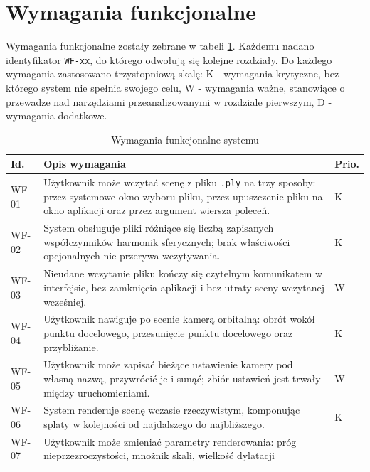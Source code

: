\section{Wymagania funkcjonalne}
\label{sec:funkcjonalne}
Wymagania funkcjonalne zostały zebrane w tabeli \ref{tab:wf}. Każdemu nadano identyfikator \texttt{WF-xx}, do którego odwołują się kolejne rozdziały. Do każdego wymagania zastosowano trzystopniową skalę: K - wymagania krytyczne, bez którego system nie spełnia swojego celu, W - wymagania ważne, stanowiące o przewadze nad narzędziami przeanalizowanymi w rozdziale pierwszym, D - wymagania dodatkowe.
\begin{table}[htbp]
  \centering
  \caption{Wymagania funkcjonalne systemu}
  \label{tab:wf}
  \small
  \renewcommand{\arraystretch}{1.15}
  \begin{tabularx}{\textwidth}{
      >{\raggedright\arraybackslash}p{}
      >{\raggedright\arraybackslash}X
      >{\centering\arraybackslash}p{}}
    \toprule
    \textbf{Id.} & \textbf{Opis wymagania} & \textbf{Prio.} \\
    \midrule
    WF-01 & Użytkownik może wczytać scenę z pliku \texttt{.ply} na trzy
            sposoby: przez systemowe okno wyboru pliku, przez upuszczenie
            pliku na okno aplikacji oraz przez argument wiersza poleceń. & K \\
    WF-02 & System obsługuje pliki różniące się liczbą zapisanych
            współczynników harmonik sferycznych; brak właściwości
            opcjonalnych nie przerywa wczytywania. & K \\
    WF-03 & Nieudane wczytanie pliku kończy się czytelnym komunikatem
            w interfejsie, bez zamknięcia aplikacji i bez utraty sceny
            wczytanej wcześniej. & W \\
    WF-04 & Użytkownik nawiguje po scenie kamerą orbitalną: obrót wokół
            punktu docelowego, przesunięcie punktu docelowego oraz
            przybliżanie. & K \\
    WF-05 & Użytkownik może zapisać bieżące ustawienie kamery pod własną
            nazwą, przywrócić je i sunąć; zbiór ustawień jest trwały
            między uruchomieniami. & W \\
    WF-06 & System renderuje scenę wczasie rzeczywistym, komponując splaty
            w kolejności od najdalszego do najbliższego. & K \\
    WF-07 & Użytkownik może zmieniać parametry renderowania: próg
            nieprzezroczystości, mnożnik skali, wielkość dylatacji

\end{tabularx}
\end{table}
